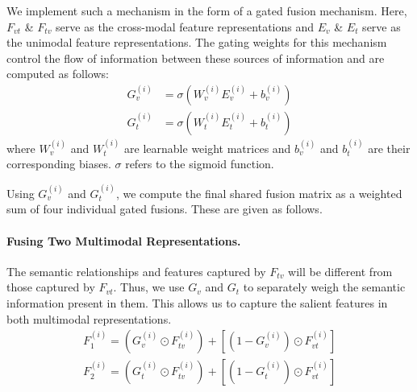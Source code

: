 We implement such a mechanism in the form of a gated fusion mechanism. Here, $F_{vt}$ \& $F_{tv}$ serve as the cross-modal feature representations and $E_v$ \& $E_t$ serve as the unimodal feature representations. The gating weights for this mechanism control the flow of information between these sources of information and are computed as follows:
\begin{equation}
    \label{eq: gated-fusion-weights}
    \begin{aligned}
        G_v^{(i)} & = \sigma(W_v^{(i)}E_v^{(i)} + b_v^{(i)}) \\  G_t^{(i)} & = \sigma(W_t^{(i)}E_t^{(i)} + b_t^{(i)})
    \end{aligned} \nonumber
\end{equation}
where $W_v^{(i)}$ and $W_t^{(i)}$ are learnable weight matrices and $b_v^{(i)}$ and $b_t^{(i)}$ are their corresponding biases. $\sigma$ refers to the sigmoid function. 

Using $G_v^{(i)}$ and $G_t^{(i)}$, we compute the final shared fusion matrix as a weighted sum of four individual gated fusions. These are given as follows.
\paragraph{Fusing Two Multimodal Representations.} The semantic relationships and features captured by $F_{tv}$ will be different from those captured by $F_{vt}$. Thus, we use $G_v$ and $G_t$ to separately weigh the semantic information present in them. This allows us to capture the salient features in both multimodal representations.
\begin{equation}
    \label{eq: F1-F2}
    \begin{aligned}
        F_1^{(i)} = (G_v^{(i)} \odot F_{tv}^{(i)}) + [(1-G_v^{(i)}) \odot F_{vt}^{(i)}] \\
        F_2^{(i)} = (G_t^{(i)} \odot F_{tv}^{(i)}) + [(1-G_t^{(i)}) \odot F_{vt}^{(i)}]
    \end{aligned}
\end{equation}

